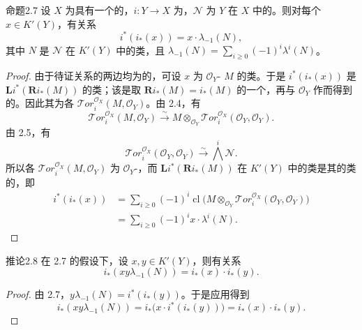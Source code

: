 \begin{SGAresult}{命题}{2.7}
设 $X$ 为具有一个的，$i:Y\to X$ 为，$\mathcal N$ 为 $Y$ 在 $X$ 中的。则对每个 $x\in K'(Y)$，有关系
\[
i^*(i_*(x))=x\cdot\lambda_{-1}(N),
\]
其中 $N$ 是 $\mathcal N$ 在 $K'(Y)$ 中的类，且 $\lambda_{-1}(N)=\sum_{i\geq0}(-1)^i\lambda^i(N)$。
\end{SGAresult}
\begin{proof}
由于待证关系的两边均为的，可设 $x$ 为 $\mathcal O_Y$- $M$ 的类。于是 $i^*(i_*(x))$ 是 $\mathbf L i^*(\mathbf R i_*(M))$ 的类；该是取 $\mathbf R i_*(M)=i_*(M)$ 的一个，再与 $\mathcal O_Y$ 作而得到的。因此其为各 $\mathcal{T}or_i^{\mathcal O_X}(M,\mathcal O_Y)$。由 2.4，有
\[
\mathcal{T}or_i^{\mathcal O_X}(M,\mathcal O_Y)
\xrightarrow{\sim}M\otimes_{\mathcal O_Y}\mathcal{T}or_i^{\mathcal O_X}(\mathcal O_Y,\mathcal O_Y).
\]
由 2.5，有
\[
\mathcal{T}or_i^{\mathcal O_X}(\mathcal O_Y,\mathcal O_Y)\xrightarrow{\sim}\bigwedge^i\mathcal N.
\]
所以各 $\mathcal{T}or_i^{\mathcal O_X}(M,\mathcal O_Y)$ 为 $\mathcal O_Y$-，而 $\mathbf L i^*(\mathbf R i_*(M))$ 在 $K'(Y)$ 中的类是其的类的，即
\[
\begin{aligned}
i^*(i_*(x))
&=\sum_{i\geq0}(-1)^i\operatorname{cl}\bigl(M\otimes_{\mathcal O_Y}\mathcal{T}or_i^{\mathcal O_X}(\mathcal O_Y,\mathcal O_Y)\bigr)\\
&=\sum_{i\geq0}(-1)^i x\cdot\lambda^i(N).
\end{aligned}
\]
\end{proof}

\begin{SGAresult}{推论}{2.8}
在 2.7 的假设下，设 $x,y\in K'(Y)$，则有关系
\[
i_*(xy\lambda_{-1}(N))=i_*(x)\cdot i_*(y).
\]
\end{SGAresult}
\begin{proof}
由 2.7，$y\lambda_{-1}(N)=i^*(i_*(y))$。于是应用得到
\[
i_*(xy\lambda_{-1}(N))=i_*\bigl(x\cdot i^*(i_*(y))\bigr)=i_*(x)\cdot i_*(y).
\]
\end{proof}

